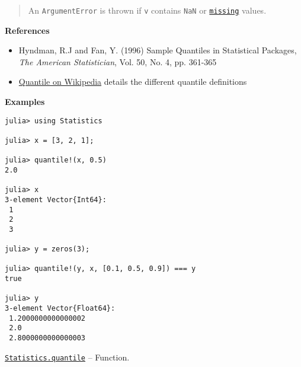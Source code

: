 \begin{adjustwidth}{2em}{0pt}
\begin{quote}
An \texttt{ArgumentError} is thrown if \texttt{v} contains \texttt{NaN} or \hyperlink{14596725676261444434}{\texttt{missing}} values.

\end{quote}
\textbf{References}

\begin{itemize}
\item Hyndman, R.J and Fan, Y. (1996) {\textquotedbl}Sample Quantiles in Statistical Packages{\textquotedbl}, \emph{The American Statistician}, Vol. 50, No. 4, pp. 361-365


\item \href{https://en.m.wikipedia.org/wiki/Quantile}{Quantile on Wikipedia} details the different quantile definitions

\end{itemize}
\textbf{Examples}


\begin{verbatim}
julia> using Statistics

julia> x = [3, 2, 1];

julia> quantile!(x, 0.5)
2.0

julia> x
3-element Vector{Int64}:
 1
 2
 3

julia> y = zeros(3);

julia> quantile!(y, x, [0.1, 0.5, 0.9]) === y
true

julia> y
3-element Vector{Float64}:
 1.2000000000000002
 2.0
 2.8000000000000003
\end{verbatim}



\end{adjustwidth}
\hypertarget{1313193106257799062}{}
\hyperlink{1313193106257799062}{\texttt{Statistics.quantile}}  -- {Function.}

